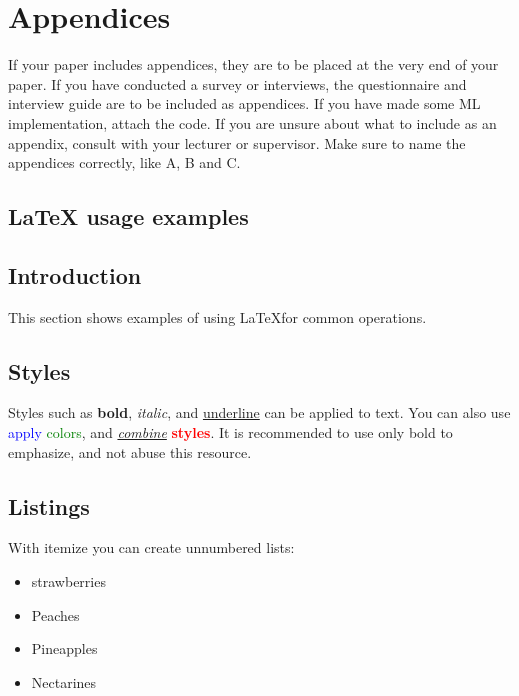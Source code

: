 \section{Appendices}
\label{sec:appendices}

If your paper includes appendices, they are to be placed at the very end of your paper. If you have conducted a survey or interviews, the questionnaire and interview guide are to be included as appendices. If you have made some ML implementation, attach the code. If you are unsure about what to include as an appendix, consult with your lecturer or supervisor. Make sure to name the appendices correctly, like A, B and C.

\subsection{LaTeX usage examples}


\subsection{Introduction}
This section shows examples of using \LaTeX for common operations. 

\subsection{Styles}
\label{sec:styles}
Styles such as \textbf{bold}, \textit{italic}, and \underline{underline} can be applied to text. You can also use \textcolor{red}{} \textcolor{blue}{apply} \textcolor{green}{colors}, and \underline{\textit{combine}} \textbf{\textcolor{red}{styles}}. It is recommended to use only bold to emphasize, and not abuse this resource.

\subsection{Listings}
With itemize you can create unnumbered lists:

\begin{itemize}
     \item strawberries
     \item Peaches
     \item Pineapples
     \item Nectarines
\end{itemize}

